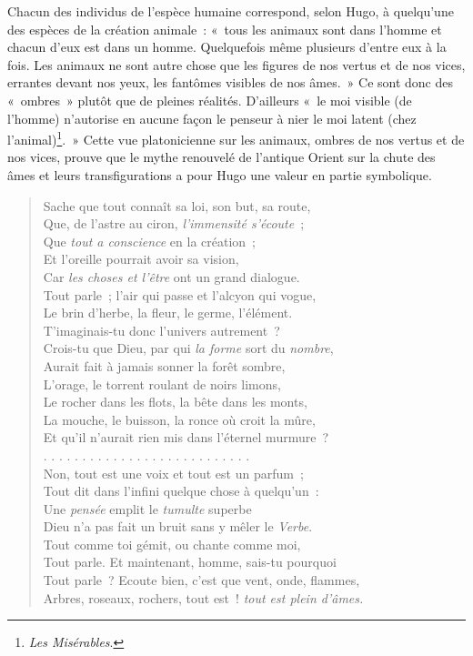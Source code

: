 \documentclass[french,twoside]{book} %
\begin{document}
\noindent Chacun des individus de l’espèce humaine correspond, selon Hugo, à quelqu’une des espèces de la création animale : « tous les animaux sont dans l’homme et chacun d’eux est dans un homme. Quelquefois même plusieurs d’entre eux à la fois. Les animaux ne sont autre chose que les figures de nos vertus et de nos vices, errantes devant nos yeux, les fantômes visibles de nos âmes. » Ce sont donc des « ombres » plutôt que de pleines réalités. D’ailleurs « le moi visible (de l’homme) n’autorise en aucune façon le penseur à nier le moi latent (chez l’animal)\footnote{\emph{Les Misérables}.}. » Cette vue platonicienne sur les animaux, ombres de nos vertus et de nos vices, prouve que le mythe renouvelé de l’antique Orient sur la chute des âmes et leurs transfigurations a pour Hugo une valeur en partie symbolique.\par


\begin{verse}
Sache que tout connaît sa loi, son but, sa route,\\
Que, de l’astre au ciron, \emph{l’immensité s’écoute} ;\\
Que \emph{tout a conscience} en la création ;\\
Et l’oreille pourrait avoir sa vision,\\
Car \emph{les choses et l’être} ont un grand dialogue.\\
Tout parle ; l’air qui passe et l’alcyon qui vogue,\\
Le brin d’herbe, la fleur, le germe, l’élément.\\
T’imaginais-tu donc l’univers autrement ?\\
Crois-tu que Dieu, par qui \emph{la forme} sort du \emph{nombre},\\
Aurait fait à jamais sonner la forêt sombre,\\
L’orage, le torrent roulant de noirs limons,\\
Le rocher dans les flots, la bête dans les monts,\\
La mouche, le buisson, la ronce où croit la mûre,\\
Et qu’il n’aurait rien mis dans l’éternel murmure ?\\
. . . . . . . . . . . . . . . . . . . . . . . . . . .\\
Non, tout est une voix et tout est un parfum ;\\
Tout dit dans l’infini quelque chose à quelqu’un :\\
Une \emph{pensée} emplit le \emph{tumulte} superbe\\
Dieu n’a pas fait un bruit sans y mêler le \emph{Verbe}.\\
Tout comme toi gémit, ou chante comme moi,\\
Tout parle. Et maintenant, homme, sais-tu pourquoi\\
Tout parle ? Ecoute bien, c’est que vent, onde, flammes,\\
Arbres, roseaux, rochers, tout est ! \emph{tout est plein d’âmes.}\\
\end{verse}
\end{document}
